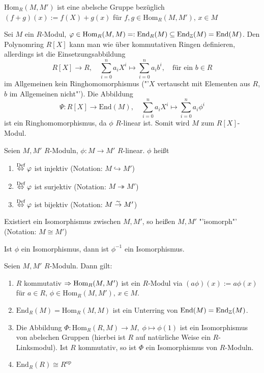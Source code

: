 \begin{anm}
	$\text{Hom}_R(M,M')$ ist eine abelsche Gruppe bezüglich $(f+g)(x) := f(X) + g(x)$ für $f,g\in \text{Hom}_R(M, M'), \, x\in M$
\end{anm}
\begin{bsp}
	Sei $M$ ein $R$-Modul, $\varphi\in \text{Hom}_R(M, M)=: \text{End}_R(M) \subseteq \text{End}_{\mathbb{Z}}(M) = \text{End}(M)$. Den Polynomring $R[X]$ kann man wie über kommutativen Ringen definieren, allerdings ist die Einsetzungsabbildung 
	$$R[X] \to R, \quad \sum_{i=0}^na_i X^i\mapsto \sum_{i=0}^na_ib^i, \quad \text{für ein } b\in R$$
	im Allgemeinen kein Ringhomomorphismus ("'$X$ vertauscht mit Elementen aus $R$, $b$ im Allgemeinen nicht"'). Die Abbildung 
	$$\Psi:R[X] \to \text{End}(M), \quad \sum_{i=0}^n a_i X^i \mapsto \sum_{i=0}^n a_i \phi^i$$
	ist ein Ringhomomorphismus, da $\phi$ $R$-linear ist. Somit wird $M$ zum $R[X]$-Modul.
\end{bsp}
\begin{df}\label{df1.5}
	Seien $M,M'$ $R$-Moduln, $\phi:M\to M'$ $R$-linear. $\phi$ heißt 
	\begin{enumerate}
		\item[]  $\overset{\text{Def}}{\Leftrightarrow} \varphi$ ist injektiv (Notation: $M \hookrightarrow M'$)
		\item[]  $\overset{\text{Def}}{\Leftrightarrow} \varphi$ ist surjektiv (Notation: $M \twoheadrightarrow M'$)
		\item[]  $\overset{\text{Def}}{\Leftrightarrow} \varphi$ ist bijektiv (Notation: $M \overset{\sim}{\rightarrow} M'$)
	\end{enumerate}
	Existiert ein Isomorphismus zwischen $M,M'$, so heißen $M,M'$ "'isomorph"' (Notation: $M \cong M'$)
\end{df}
\begin{anm}
	Ist $\phi$ ein Isomorphismus, dann ist $\phi^{-1}$ ein Isomorphismus.
\end{anm}
\begin{bem}
	Seien $M,M'$ $R$-Moduln. Dann gilt:
	\begin{enumerate}[label=\alph*)]
		\item $R$ kommutativ $\Rightarrow \text{Hom}_R(M, M')$ ist ein $R$-Modul via $(a \phi)(x):= a\phi(x)$ für $a\in R, \, \phi \in \text{Hom}_R(M, M'), \, x\in M$.
		\item $\text{End}_R(M) = \text{Hom}_R(M, M)$ ist ein Unterring von $\text{End}(M) = \text{End}_{\mathbb{Z}}(M)$.
		\item Die Abbildung $\Phi:\text{Hom}_R(R, M)\to M, \; \phi \mapsto \phi(1)$ ist ein Isomorphismus von abelschen Gruppen (hierbei ist $R$ auf natürliche Weise ein $R$-Linksmodul). Ist $R$ kommutativ, so ist $\Phi$ ein Isomorphismus von $R$-Moduln.
		\item $\text{End}_R(R)\cong R^\text{op}$
	\end{enumerate}
\end{bem}
